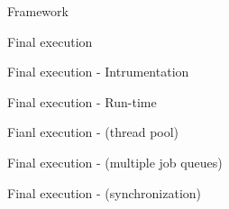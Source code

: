 \documentclass[xcolor=dvipsnames]{beamer}
\begin{document}
\begin{section}{Framework}
\begin{frame}{\hskip 0.3cm Final execution}
\end{frame}












\begin{frame}{\hskip 0.3cm Final execution - Intrumentation}
\end{frame}












\begin{frame}{\hskip 0.3cm Final execution - Run-time}
\end{frame}












\begin{frame}{\hskip 0.3cm Fianl execution - (thread pool)}
\end{frame}












\begin{frame}{\hskip 0.3cm Final execution - (multiple job queues)}
\end{frame}












\begin{frame}{\hskip 0.3cm Final execution - (synchronization)}
\end{frame}












\end{section}
\end{document}

